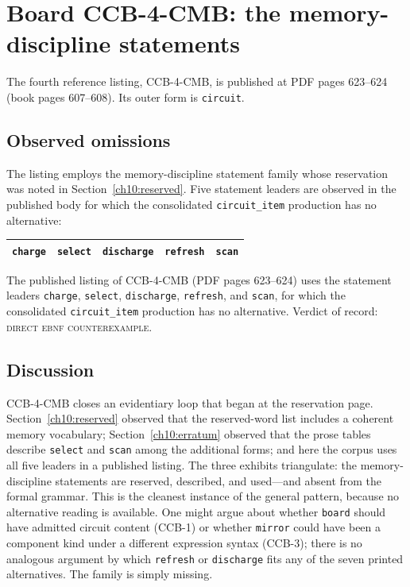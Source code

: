 \section{Board CCB-4-CMB: the memory-discipline statements}\label{ch10:ccb4}

The fourth reference listing, CCB-4-CMB, is published at PDF pages 623--624 (book pages 607--608). Its outer form is \texttt{circuit}.

\subsection{Observed omissions}

The listing employs the memory-discipline statement family whose reservation was noted in Section~\ref{ch10:reserved}. Five statement leaders are observed in the published body for which the consolidated \texttt{circuit\_item} production has no alternative:

\begin{center}
\begin{tabular}{@{}lllll@{}}
\toprule
\texttt{charge} & \texttt{select} & \texttt{discharge} & \texttt{refresh} & \texttt{scan} \\
\bottomrule
\end{tabular}
\end{center}

\begin{finding}\label{ch10:find-ccb4}
The published listing of CCB-4-CMB (PDF pages 623--624) uses the statement leaders \texttt{charge}, \texttt{select}, \texttt{discharge}, \texttt{refresh}, and \texttt{scan}, for which the consolidated \texttt{circuit\_item} production has no alternative. Verdict of record: \textsc{direct ebnf counterexample}.
\end{finding}

\subsection{Discussion}

CCB-4-CMB closes an evidentiary loop that began at the reservation page. Section~\ref{ch10:reserved} observed that the reserved-word list includes a coherent memory vocabulary; Section~\ref{ch10:erratum} observed that the prose tables describe \texttt{select} and \texttt{scan} among the additional forms; and here the corpus uses all five leaders in a published listing. The three exhibits triangulate: the memory-discipline statements are reserved, described, and used---and absent from the formal grammar. This is the cleanest instance of the general pattern, because no alternative reading is available. One might argue about whether \texttt{board} should have admitted circuit content (CCB-1) or whether \texttt{mirror} could have been a component kind under a different expression syntax (CCB-3); there is no analogous argument by which \texttt{refresh} or \texttt{discharge} fits any of the seven printed alternatives. The family is simply missing.

